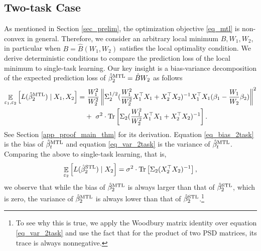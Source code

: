 \subsection{Two-task Case}\label{sec_two}

As mentioned in Section \ref{sec_prelim}, the optimization objective \eqref{eq_mtl} is non-convex in general.
Therefore, we consider an arbitrary local minimum $B, W_1, W_2$, in particular when $B = \hat{B}(W_1, W_2)$ satisfies the local optimality condition.
We derive deterministic conditions to compare the prediction loss of the local minimum to single-task learning.
Our key insight is a bias-variance decomposition of the expected prediction loss of $\hat{\beta}_2^{\textup{MTL}} = \hat{B} W_2$ as follows
\begin{align}
	\mathop{\mathbb{E}}_{\varepsilon_1, \varepsilon_2}\left[ L(\hat{\beta}_2^{\textup{MTL}}) \mid X_1, X_2 \right]
	=&~ \frac{W_1^2}{W_2^2} \left\| \Sigma_2^{1/2}(\frac{W_1^2}{W_2^2} X_1^{\top}X_1 + X_2^{\top}X_2)^{-1} X_1^{\top}X_1 (\beta_1 - \frac{W_1}{W_2} \beta_2) \right\|^2 \label{eq_bias_2task} \\
			&+~  \sigma^2\cdot \operatorname{Tr}\left[\Sigma_2(\frac{W_1^2}{W_2^2} X_1^{\top}X_1 + X_2^{\top}X_2)^{-1} \right]. \label{eq_var_2task}
\end{align}
See Section \ref{app_proof_main_thm} for its derivation.
Equation \eqref{eq_bias_2task} is the bias of $\hat{\beta}_t^{\textup{MTL}}$ and
equation \eqref{eq_var_2task} is the variance of $\hat{\beta}_t^{\textup{MTL}}$.
Comparing the above to single-task learning, that is,
\begin{align}
	\mathop{\mathbb{E}}_{\varepsilon_2}\left[ L(\hat{\beta}_2^{\textup{STL}}) \mid X_2 \right] = \sigma^2 \cdot \operatorname{Tr}\left[\Sigma_2 (X_2^{\top} X_2)^{-1}\right], \label{eq_var_stl}
\end{align}
we observe that while the bias of $\hat{\beta}_2^{\textup{MTL}}$ is always larger than that of $\hat{\beta}_2^{\textup{STL}}$, which is zero, the variance of $\hat{\beta}_2^{\textup{MTL}}$ is always lower than that of $\hat{\beta}_2^{\textup{STL}}$.\footnote{To see why this is true, we apply the Woodbury matrix identity over equation \eqref{eq_var_2task} and use the fact that for the product of two PSD matrices, its trace is always nonnegative.}
